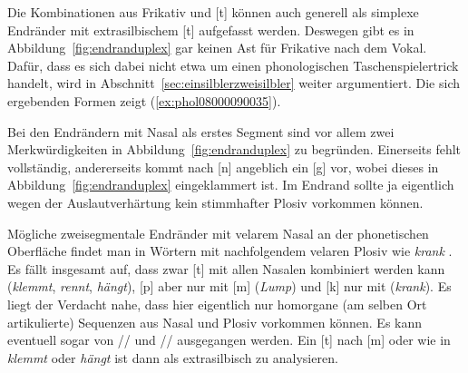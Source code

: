 Die Kombinationen aus Frikativ und [t] können auch generell als simplexe Endränder mit extrasilbischem [t] aufgefasst werden.
Deswegen gibt es in Abbildung~\ref{fig:endranduplex} gar keinen Ast für Frikative nach dem Vokal.
Dafür, dass es sich dabei nicht etwa um einen phonologischen Taschenspielertrick handelt, wird in Abschnitt~\ref{sec:einsilblerzweisilbler} weiter argumentiert.
Die sich ergebenden Formen zeigt (\ref{ex:phol08000090035}).

\begin{exe}
  \ex \label{ex:phol08000090035}
  \begin{xlist}
  \end{xlist}
\end{exe}

Bei den Endrändern mit Nasal als erstes Segment sind vor allem zwei Merkwürdigkeiten in Abbildung~\ref{fig:endranduplex} zu begründen.
Einerseits fehlt \textipa{[N]} vollständig, andererseits kommt nach [n] angeblich ein [g] vor, wobei dieses in Abbildung~\ref{fig:endranduplex} eingeklammert ist.
Im Endrand sollte ja eigentlich wegen der Auslautverhärtung kein stimmhafter Plosiv vorkommen können.

Mögliche zweisegmentale Endränder mit velarem Nasal \textipa{[N]} an der phonetischen Oberfläche findet man in Wörtern mit nachfolgendem velaren Plosiv wie \textit{krank} \textipa{[kKaNk]}.
Es fällt insgesamt auf, dass zwar [t] mit allen Nasalen kombiniert werden kann (\textit{klemmt}, \textit{rennt}, \textit{hängt}), [p] aber nur mit [m] (\textit{Lump}) und [k] nur mit \textipa{[N]} (\textit{krank}).
Es liegt der Verdacht nahe, dass hier eigentlich nur homorgane (am selben Ort artikulierte) Sequenzen aus Nasal und Plosiv vorkommen können.
Es kann eventuell sogar von // \phopro \textipa{[kKaNk]} und // \phopro \textipa{[lUmp]} ausgegangen werden. 
Ein [t] nach [m] oder \textipa{[N]} wie in \textit{klemmt} oder \textit{hängt} ist dann als extrasilbisch zu analysieren.

